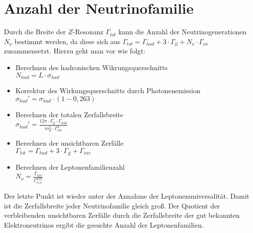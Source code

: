 \documentclass{include/thesisclass3}
\newcommand{\cc}{\cdot}
\begin{document}
\section{Anzahl der Neutrinofamilie}
Durch die Breite der $Z$-Resonanz $\Gamma_{tot}$ kann die Anzahl der Neutrinogenerationen $N_\nu$ bestimmt werden, da diese sich aus $\Gamma_{tot} = \Gamma_{had} + 3 \cc \Gamma_{l \bar l} + N_\nu \cc \Gamma_{\nu \bar \nu}$ zusammensetzt. Hierzu geht man vor wie folgt:\\
\begin{itemize}
\item Berechnen des hadronischen Wikrungsquerschnitts\\
$N_{had}=L\cdot \sigma_{had}$

\item Korrektur des Wirkungsquerschnitts durch Photonenemission\\
$\sigma_{had}'=\sigma_{had}\cdot(1-0,263) $

\item Berechnen der totalen Zerfallsbreite\\
$\sigma_{had}'=\frac{12 \pi \cdot \Gamma_{l\bar{l}}\cdot \Gamma_{had}}{m_Z^2\cdot \Gamma_{tot}^2}$
\item Berechnen  der unsichtbaren Zerfälle\\
$\Gamma_{tot} = \Gamma_{had} + 3 \cc \Gamma_{l \bar l} + \Gamma_{inv}$

\item  Berechnen der Leptonenfamilienzahl\\
$N_\nu=\frac{\Gamma_{inv}}{\Gamma_{\nu_e\bar{\nu_e}}^{SM}}$
\end{itemize}
Der letzte Punkt ist wieder unter der Annahme der Leptonenuniversalität. Damit ist die Zerfallsbreite jeder Neutrinofamilie gleich groß. Der Quotient der verbleibenden unsichtbaren Zerfälle durch die Zerfallsbreite der gut bekannten Elektroneutrinos ergibt die gesuchte Anzahl der Leptonenfamilien.
\end{document}
